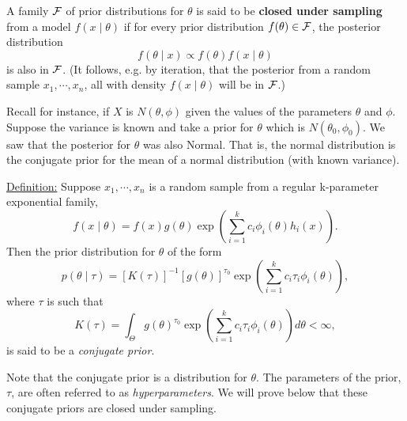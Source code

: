 \documentclass[12pt]{article}
\begin{document}
A family $\cal F$ of prior distributions for $\theta$ is said to be
{\bf closed under sampling} from a model $f(x\mid \theta)$ if for
every prior distribution $f(\theta)\in {\cal F}$, the posterior
distribution
$$f(\theta\mid x)\propto f(\theta)f(x\mid\theta)$$
is also in $\cal F$.  (It follows, e.g. by iteration, that the
posterior from a random sample $x_1,\cdots,x_n$, all with density
$f(x\mid \theta)$ will be in $\cal F$.)

Recall for instance,  if $X$ is $N(\theta,\phi)$ given
the values of the parameters $\theta$ and $\phi$.  Suppose the
variance is known and take a prior for $\theta$ which is
$N(\theta_0,\phi_0)$.  We saw that the posterior for $\theta$ was also
Normal. That is, the normal distribution is the conjugate prior for the mean of a normal distribution (with known variance).

\underline{Definition:}  Suppose $x_1,\cdots,x_n$ is a random sample from a
  regular k-parameter exponential family,
$$f(x\mid \theta)=f(x)g(\theta)\exp\left( \sum_{i=1}^k c_i \phi_i
  (\theta) h_i (x) \right).$$
 Then the prior distribution
  for $\theta$ of the form
$$p(\theta\mid\tau)=[K(\tau)]^{-1} [g(\theta)]^{\tau_0} \exp\left(
  \sum_{i=1}^k c_i \tau_i \phi_i (\theta)  \right),$$
where $\tau$ is such that
$$
K(\tau) = \int_{\Theta} g(\theta)^{\tau_0} \exp \left(\sum_{i=1}^k c_i \tau_i \phi_i(\theta)\right) d\theta < \infty,
$$
is said to be a {\it conjugate prior}.  


Note that the conjugate prior is a distribution for $\theta$.  The parameters of the prior, $\tau$, are often referred to as {\it hyperparameters}.  We will prove below that these
conjugate priors are closed under sampling.
\end{document}
